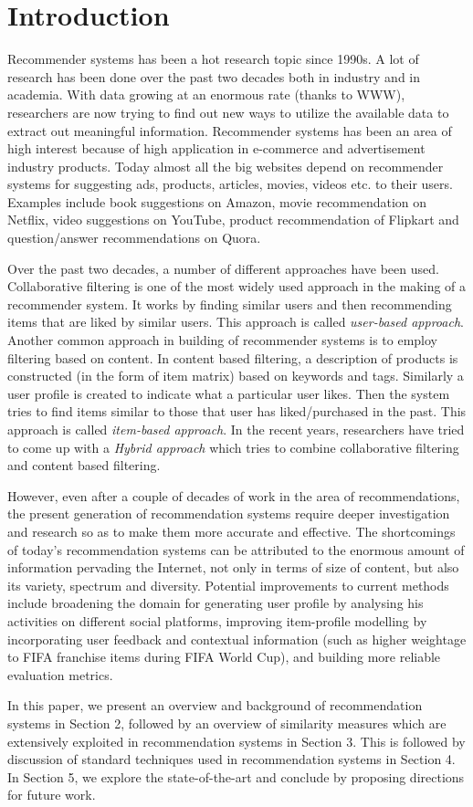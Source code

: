 \section{Introduction}
Recommender systems has been a hot research topic since 1990s. A lot of research has been done over the past two decades both in industry and in academia. With data growing at an enormous rate (thanks to WWW), researchers are now trying to find out new ways to utilize the available data to extract out meaningful information.  Recommender systems has been an area of high interest because of high application in e-commerce and advertisement industry products. Today almost all the big websites depend on recommender systems for suggesting ads, products, articles, movies, videos etc. to their users. Examples include book suggestions on Amazon, movie recommendation on Netflix, video suggestions on YouTube, product recommendation of Flipkart and question/answer recommendations on Quora. 

Over the past two decades, a number of different approaches have been used. Collaborative filtering is one of the most widely used approach in the making of a recommender system. It works by finding similar users and then recommending items that are liked by similar users. This approach is called \textit{user-based approach}. Another common approach in building of recommender systems is to employ filtering based on content. In content based filtering, a description of products is constructed (in the form of item matrix) based on keywords and tags. Similarly a user profile is created to indicate what a particular user likes. Then the system tries to find items similar to those that user has liked/purchased in the past. This approach is called \textit{item-based approach}. In the recent years, researchers have tried to come up with a \textit{Hybrid approach} which tries to combine collaborative filtering and content based filtering. 

However, even after a couple of decades of work in the area of recommendations, the present generation of recommendation systems require deeper investigation and research so as to make them more accurate and effective. The shortcomings of today's recommendation systems can be attributed to the enormous amount of information pervading the Internet, not only in terms of size of content, but also its variety, spectrum and diversity. Potential improvements to current methods include broadening the domain for generating user profile by analysing his activities on different social platforms, improving item-profile modelling by incorporating user feedback and contextual information (such as higher weightage to FIFA franchise items during FIFA World Cup), and building more reliable evaluation metrics. 

In this paper, we present an overview and background of recommendation systems in Section 2, followed by an overview of similarity measures which are extensively exploited in recommendation systems in Section 3. This is followed by discussion of standard techniques used in recommendation systems in Section 4. In Section 5, we explore the state-of-the-art and conclude by proposing directions for future work. 